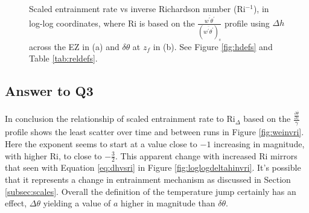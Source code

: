 \begin{figure}[htbp]
\begin{minipage}[b]{0.5\linewidth}
        \\
        \end{minipage}             
\quad
\begin{minipage}[b]{0.5\linewidth}
        \\
       
       \end{minipage}
        \caption[Scaled Entrainment Rate vs inverse Richardson Number (ii)]{Scaled entrainment rate vs inverse Richardson number (\acs{Ri}$^{-1}$), in log-log coordinates, where \acs{Ri} is based on the $\frac{\overline{w^{'}\theta^{'}}}{(\overline{w^{'}\theta^{'}})_{s}}$
profile using $\Delta h$ across the \acs{EZ} in (a) and $\delta \theta$ at $z_{f}$ in (b).  See Figure \ref{fig:hdefs} and Table \ref{tab:reldefs}.}
        \label{fig:weinvri_f}
\end{figure}

\subsection{Answer to Q3}
In conclusion the relationship of scaled entrainment rate to \acs{Ri}$_{\Delta}$ based on the $\frac{\frac{\partial \overline{\theta}}{\partial z}}{\gamma}$ profile shows the least scatter over time and between runs in Figure \ref{fig:weinvri}.  Here the exponent seems to start at a value close to $-1$ increasing in magnitude, with higher \acs{Ri}, to close to $-\frac{3}{2}$.  This apparent change with increased \acs{Ri} mirrors that seen with Equation \ref{eq:dhvsri} in Figure \ref{fig:loglogdeltahinvri}.  It's possible that it represents a change in entrainment mechanism as discussed in Section \ref{subsec:scales}.  Overall the definition of the temperature jump certainly has an effect, $\Delta \theta$ yielding a value of $a$ higher in magnitude than $\delta \theta$.

\endinput

Any text after an \endinput is ignored.
You could put scraps here or things in progress.

